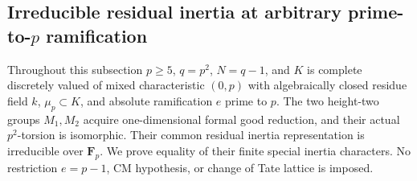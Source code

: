 \subsection{Irreducible residual inertia at arbitrary prime-to-\(p\) ramification}

Throughout this subsection \(p\ge5\), \(q=p^2\), \(N=q-1\), and
\(K\) is complete discretely valued of mixed characteristic \((0,p)\)
with algebraically closed residue field \(k\), \(\mu_p\subset K\),
and absolute ramification \(e\) prime to \(p\). The two height-two
groups \(M_1,M_2\) acquire one-dimensional formal good reduction,
and their actual \(p^2\)-torsion is isomorphic. Their common residual
inertia representation is irreducible over \(\mathbf F_p\).
We prove equality of their finite special inertia characters.
No restriction \(e=p-1\), CM hypothesis, or change of Tate lattice
is imposed.

